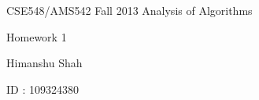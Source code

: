 \documentclass[letterpaper,portrait,12pt]{article}
\begin{document}
\setlength{\oddsidemargin}{0.6250in-1in}

\begin{center}

\end{center}


\begin{center}

\end{center}


\begin{center}

\end{center}


\begin{center}

\end{center}


\begin{center}
{\huge CSE548/AMS542 Fall 2013 Analysis of Algorithms}
\end{center}


\begin{center}

\end{center}


\begin{center}
{\huge Hom}{\huge ework 1}
\end{center}


\begin{center}
{\huge Himanshu Shah}
\end{center}


\begin{center}
{\huge ID : 1093}{\huge 24380}
\end{center}


\begin{center}

\end{center}


\begin{center}

\end{center}


\begin{center}

\end{center}


\begin{center}

\end{center}


\begin{center}

\end{center}
\end{document}
